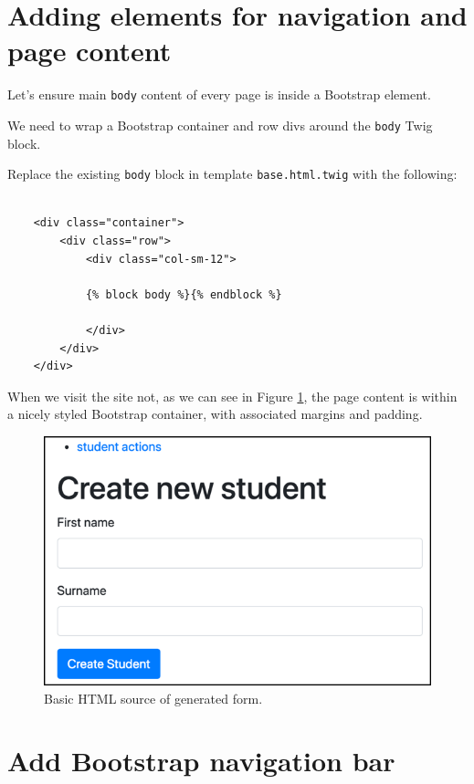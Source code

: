 \documentclass[a4paperpaper,openright]{book}
\begin{document}
\hypertarget{adding-elements-for-navigation-and-page-content}{%
\section{Adding elements for navigation and page
content}\label{adding-elements-for-navigation-and-page-content}}

Let's ensure main \texttt{body} content of every page is inside a
Bootstrap element.

We need to wrap a Bootstrap container and row divs around the
\texttt{body} Twig block.

Replace the existing \texttt{body} block in template
\texttt{base.html.twig} with the following:

\begin{verbatim}

    <div class="container">
        <div class="row">
            <div class="col-sm-12">

            {% block body %}{% endblock %}

            </div>
        </div>
    </div>
\end{verbatim}

When we visit the site not, as we can see in Figure
\ref{form_nice_body}, the page content is within a nicely styled
Bootstrap container, with associated margins and padding.

\begin{figure}
\centering
\includegraphics{./tex2pdf.-51e064f4751cea0e/b7aec3203c234fdc0b487b9331755c42a04f3b27.png}
\caption{Basic HTML source of generated form. \label{form_nice_body}}
\end{figure}

\hypertarget{add-bootstrap-navigation-bar}{%
\section{Add Bootstrap navigation
bar}\label{add-bootstrap-navigation-bar}}
\end{document}
